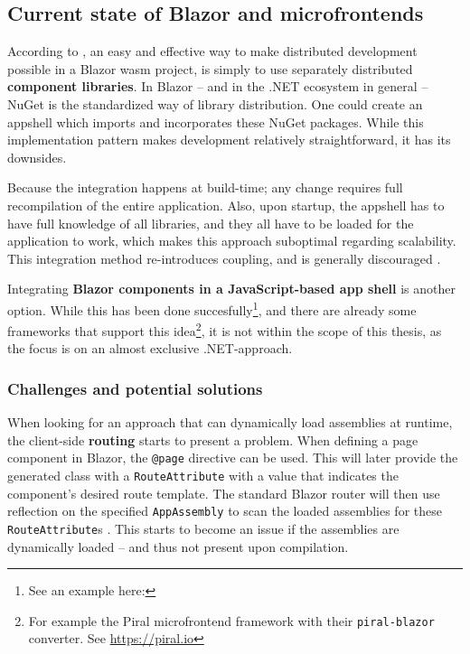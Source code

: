 \subsection{Current state of Blazor and microfrontends}

According to \textcite{Rappl_MunichNETMeetup_2020}, an easy and effective way to
make distributed development possible in a Blazor \gls{wasm} project, is simply
to use separately distributed \textbf{component libraries}. In Blazor -- and in
the .NET ecosystem in general -- NuGet is
the standardized way of library distribution. One could create an \gls{appshell}
which imports and incorporates these NuGet packages. While this implementation
pattern makes development relatively straightforward, it has its downsides.

Because the integration happens at build-time; any change requires full
recompilation of the entire application. Also, upon startup, the \gls{appshell}
has to have full knowledge of all libraries, and they all have to be loaded for
the application to work, which makes this approach suboptimal regarding
scalability. This integration method re-introduces coupling, and is generally
discouraged \autocite{Jackson_2019}.

Integrating \textbf{Blazor components in a JavaScript-based app shell} is
another option. While this has been done succesfully\footnote{See an example
here: }, and
there are already some frameworks that support this idea\footnote{For example
the Piral \gls{microfrontend} framework with their \texttt{piral-blazor} converter.
See \url{https://piral.io}}, it is not within the scope of this thesis, as the
focus is on an almost exclusive .NET-approach.

\subsubsection{Challenges and potential solutions}

When looking for an approach that can dynamically load assemblies at runtime,
the client-side \textbf{routing} starts to present a problem. When defining a
page component in Blazor, the \texttt{@page} directive can be used. This will
later provide the generated class with a \texttt{RouteAttribute} with a value
that indicates the component's desired route template. The standard Blazor
router will then use reflection on the specified \texttt{AppAssembly} to scan the
loaded assemblies for these \texttt{RouteAttribute}s \autocite{Sainty_2019}.
This starts to become an issue if the assemblies are dynamically loaded -- and
thus not present upon compilation. 

